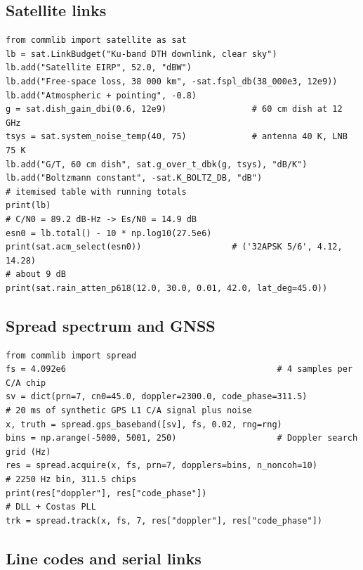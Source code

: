 \subsection{Satellite links}

\begin{lstlisting}
from commlib import satellite as sat
lb = sat.LinkBudget("Ku-band DTH downlink, clear sky")
lb.add("Satellite EIRP", 52.0, "dBW")
lb.add("Free-space loss, 38 000 km", -sat.fspl_db(38_000e3, 12e9))
lb.add("Atmospheric + pointing", -0.8)
g = sat.dish_gain_dbi(0.6, 12e9)                 # 60 cm dish at 12 GHz
tsys = sat.system_noise_temp(40, 75)             # antenna 40 K, LNB 75 K
lb.add("G/T, 60 cm dish", sat.g_over_t_dbk(g, tsys), "dB/K")
lb.add("Boltzmann constant", -sat.K_BOLTZ_DB, "dB")
# itemised table with running totals
print(lb)
# C/N0 = 89.2 dB-Hz -> Es/N0 = 14.9 dB
esn0 = lb.total() - 10 * np.log10(27.5e6)
print(sat.acm_select(esn0))                  # ('32APSK 5/6', 4.12, 14.28)
# about 9 dB
print(sat.rain_atten_p618(12.0, 30.0, 0.01, 42.0, lat_deg=45.0))
\end{lstlisting}


\subsection{Spread spectrum and GNSS}

\begin{lstlisting}
from commlib import spread
fs = 4.092e6                                          # 4 samples per C/A chip
sv = dict(prn=7, cn0=45.0, doppler=2300.0, code_phase=311.5)
# 20 ms of synthetic GPS L1 C/A signal plus noise
x, truth = spread.gps_baseband([sv], fs, 0.02, rng=rng)
bins = np.arange(-5000, 5001, 250)                    # Doppler search grid (Hz)
res = spread.acquire(x, fs, prn=7, dopplers=bins, n_noncoh=10)
# 2250 Hz bin, 311.5 chips
print(res["doppler"], res["code_phase"])
# DLL + Costas PLL
trk = spread.track(x, fs, 7, res["doppler"], res["code_phase"])
\end{lstlisting}

\subsection{Line codes and serial links}

